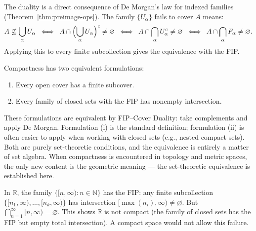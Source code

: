 \begin{remark*}
The duality is a direct consequence of De Morgan's law for indexed families
(Theorem~\ref{thm:preimage-ops}). The family $\{U_\alpha\}$ fails to cover
$A$ means:
\[
A \not\subseteq \bigcup_\alpha U_\alpha
\;\;\Longleftrightarrow\;\;
A \cap \Bigl(\bigcup_\alpha U_\alpha\Bigr)^c \neq \varnothing
\;\;\Longleftrightarrow\;\;
A \cap \bigcap_\alpha U_\alpha^c \neq \varnothing
\;\;\Longleftrightarrow\;\;
A \cap \bigcap_\alpha F_\alpha \neq \varnothing.
\]
Applying this to every finite subcollection gives the equivalence with the FIP.
\end{remark*}

\begin{remark*}
Compactness has two equivalent formulations:
\begin{enumerate}[label=(\roman*)]
\item Every open cover has a finite subcover.
\item Every family of closed sets with the FIP has nonempty intersection.
\end{enumerate}
These formulations are equivalent by FIP--Cover Duality: take complements and
apply De Morgan. Formulation (i) is the standard definition; formulation (ii)
is often easier to apply when working with closed sets (e.g., nested compact
sets). Both are purely set-theoretic conditions, and the equivalence is
entirely a matter of set algebra. When compactness is encountered in topology
and metric spaces, the only new content is the geometric meaning — the
set-theoretic equivalence is established here.
\end{remark*}

\begin{example*}
In $\mathbb{R}$, the family $\{[n, \infty) : n \in \mathbb{N}\}$ has the FIP:
any finite subcollection $\{[n_1,\infty), \dots, [n_k,\infty)\}$ has
intersection $[\max(n_i), \infty) \neq \varnothing$. But
$\bigcap_{n=1}^\infty [n, \infty) = \varnothing$. This shows $\mathbb{R}$ is
not compact (the family of closed sets has the FIP but empty total
intersection). A compact space would not allow this failure.
\end{example*}
